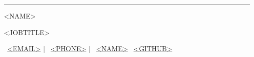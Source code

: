 \documentclass[a4paper,11pt]{article}
\begin{document}
  \begin{center}\color{MidnightBlue}\rule{17cm}{3pt}\end{center}
  \vspace{-1.5ex}
  \begin{center}{\Huge \color{MidnightBlue}<NAME>}\end{center}
  \begin{center}{\huge \color{gray66}<JOBTITLE>}\end{center}

  \vspace{-3.5ex}
  \begin{center}\color{MidnightBlue}\small
  \faEnvelope \ \href{mailto:<EMAIL>}{<EMAIL>} | \faPhoneSquare \ \href{tel:<PHONE>}{<PHONE>} | \faLinkedinSquare \ \href{https://www.linkedin.com/in/<LINKEDIN_ID>/}{<NAME>} \faGithub \ \href{https://github.com/<GITHUB>/}{<GITHUB>}
  \end{center}

  \vspace{0.5cm}
  
  {\color{gray33}}

  \vspace{0.5cm}
  
\end{document}
